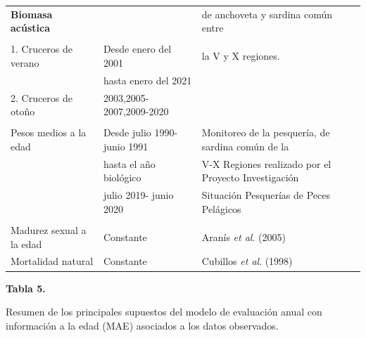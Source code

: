 \documentclass[
  spanish,
]{article}
\begin{document}
\begin{table}[h]
{\begin{tabular}{|l|l|l|}
\textbf{Biomasa acústica}    &                                    & de anchoveta y sardina común entre            \\
                             &                                    & \\
1. Cruceros de verano        & Desde enero del 2001               & la V y X regiones.                             \\
                             & hasta enero del 2021               &                                                 \\
2. Cruceros de otoño         & 2003,2005-2007,2009-2020           &                                                  \\ \hline
                             &                                    & \\
Pesos medios a la edad       & Desde julio 1990- junio 1991       & Monitoreo de la pesquería, de sardina común de la \\   
                             & hasta el año biológico             & V-X Regiones realizado por el Proyecto Investigación \\
                             & julio 2019- junio 2020             & Situación Pesquerías de Peces Pelágicos               \\ 
                             &                                    &                                                  \\ \hline
Madurez sexual a la edad     & Constante                          & Aranís \textit{et al}. (2005)                          \\ \hline
Mortalidad natural           & Constante                          & Cubillos \textit{et al}. (1998)                         \\ \hline 
  \end{tabular}}
        \end{table}

\pagebreak

\small
\begin{center} 
\textbf{Tabla 5.}
\end{center}
\begin{center} 
\vspace{-0.2cm} Resumen de los principales supuestos del modelo de evaluación anual con información a la edad (MAE) asociados a los datos observados.
\end{center}
\vspace{-0.2cm}
\end{document}
